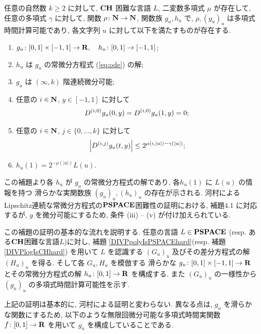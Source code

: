  \begin{lemma}
  \label{KTimesFamily}
  任意の自然数 $k \ge 2$ に対して,
  $\mathbf{CH}$ 困難な言語 $L$,
  二変数多項式 $\mu$ が存在して,
  任意の多項式 $\gamma$ に対して,
  関数 $\rho \colon \mathbf N \to \mathbf N$, 関数族 $g_u, h_u$ で,
  $\rho, (g_u)_u$ は多項式時間計算可能であり,
  各文字列 $u$ に対して以下を満たすものが存在する.
  \begin{enumerate}
   \item $g_u\colon [0,1] \times [-1,1]\to \mathbf R, \quad h_u\colon [0,1] \to [-1,1]$;
   \item $h_u$ は $g_u$ の常微分方程式 (\ref{eq:ode}) の解;
   \item $g_u$ は $(\infty, k)$ 階連続微分可能;
   \item \label{enum:boundary}
	 任意の $i \in \mathbf N$, $y \in [-1,1]$ に対して
	 \begin{equation*}
	  D^{(i, 0)} g_u(0,y) = D^{(i, 0)} g_u(1,y) = 0 ;
	 \end{equation*}
   \item \label{enum:inftyk}
	 任意の $i \in \mathbf N$, $j \in \{0, \dots, k\}$ に対して
	 \begin{equation*}
	  \left|D^{(i,j)} g_u(t,y)\right| \le 2^{\mu(i, |u|) - \gamma(|u|)};
	 \end{equation*}
   \item $h_u(1) = 2^{-\rho(|u|)}L(u)$.
  \end{enumerate}
 \end{lemma}


 この補題より各 $h_u$ が $g_u$ の常微分方程式の解であり, 
 各$h_u(1)$ に $L(u)$ の情報を持つ
 滑らかな実関数族 $(g_u)_u, (h_u)_u$ の存在が示される.
 河村によるLipschitz連続な常微分方程式の$\mathbf{PSPACE}$困難性の証明における,
 補題4.1 に対応するが,
 $g$ を微分可能にするため, 条件 (iii) -- (v) が付け加えられている.


 この補題の証明の基本的な流れを説明する.
 任意の言語 $L \in \mathbf{PSPACE}$ (resp. ある$\mathbf{CH}$困難な言語$L$)に対し, 
 補題 \ref{DIVPpolyIsPSPACEhard}(resp. 補題 \ref{DIVPlogIsCHhard})
 を用いて $L$ を認識する $(G_u)_u$ 
 及びその差分方程式の解 $(H_u)_u$ を得る.
 そして各 $G_u, H_u$ を模倣する
 滑らかな $g_u \colon [0,1] \times [-1, 1] \to \mathbf R$ 
 とその常微分方程式の解 $h_u \colon [0,1] \to \mathbf R$ を構成する.
 また $(G_u)_u$ の一様性から $(g_u)_u$ の多項式時間計算可能性を示す.

 上記の証明は基本的に, 河村による証明と変わらない\cite[補題4.1]{kawamura2010lipschitz}.
 異なる点は, $g_u$ を滑らかな関数にするため, 
 以下のような無限回微分可能な多項式時間実関数 $f \colon [0,1] \to \mathbf R$ を用いて
 $g_u$ を構成していることである.

